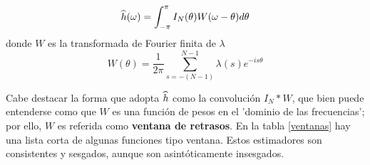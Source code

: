 \begin{equation*}
\widehat{ h }(\omega) = \int_{-\pi}^{\pi} I_N(\theta) W(\omega-\theta) d\theta
\end{equation*}
donde $W$ es la transformada de Fourier finita de $\lambda$
\begin{equation*}
W(\theta) = \frac{1}{2\pi} \sum_{s = -(N-1)}^{N-1} \lambda(s) e^{-is\theta}
\end{equation*}

Cabe destacar la forma que adopta $\widehat{ h }$ como la convoluci\'on $I_N \ast W$, que bien puede 
entenderse como que $W$ es una funci\'on de pesos en el 'dominio de las frecuencias'; por ello, $W$ 
es referida como \textbf{ventana de retrasos}.
En la tabla \ref{ventanas} hay una lista corta de algunas funciones tipo ventana. Estos estimadores 
son consistentes y sesgados, aunque son asint\'oticamente insesgados.

